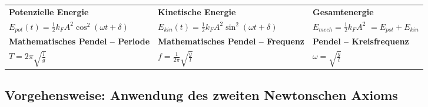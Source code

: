 \documentclass[10pt,a4paper]{article}
\begin{document}
\begin{tabular}{p{} p{} p{}}
			\textbf{Potenzielle Energie} &
			\textbf{Kinetische Energie} &
            \textbf{Gesamtenergie} 
			\\[6pt]
			
			$E_{pot}(t)=\tfrac12 k_F A^2\cos^2(\omega t+\delta)$ &
			$E_{kin}(t)=\tfrac12 k_F A^2\sin^2(\omega t+\delta)$ &
            $E_{mech}=\tfrac12 k_F A^2$ \newline
            $= E_{pot} + E_{kin}$ 
			\\[14pt]
			

			\textbf{Mathematisches Pendel – Periode} &
			\textbf{Mathematisches Pendel – Frequenz} &
            \textbf{Pendel – Kreisfrequenz} 
			\\[6pt]
			
			$T = 2\pi\sqrt{\tfrac{l}{g}}$ &
			$f = \tfrac{1}{2\pi}\sqrt{\tfrac{g}{l}}$ &
            $\omega = \sqrt{\tfrac{g}{l}}$
			\\[14pt]
			
		\end{tabular}
		
		\subsection{Vorgehensweise: Anwendung des zweiten Newtonschen Axioms}
		
\end{document}

